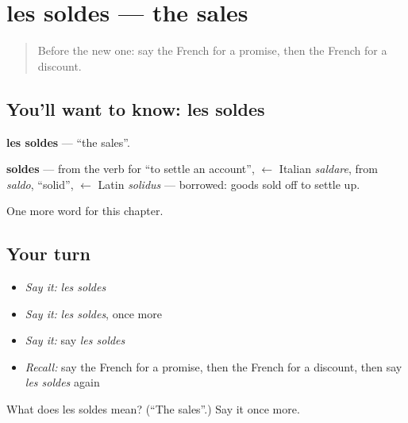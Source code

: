 \section[les soldes]{les soldes — the sales}

\label{lesson:FR-C198-soldes}



\begin{quote}
Before the new one: say the French for a promise, then the French for a discount.
\end{quote}

\subsection*{You'll want to know: les soldes}
\textbf{les soldes} — \textquotedblleft{}the sales\textquotedblright{}.

\begin{cousinweb}
\textbf{soldes} — from the verb for \textquotedblleft{}to settle an account\textquotedblright{}, $\leftarrow$ Italian \emph{saldare}, from \emph{saldo}, \textquotedblleft{}solid\textquotedblright{}, $\leftarrow$ Latin \emph{solidus} — borrowed: goods sold off to settle up.
\end{cousinweb}

\begin{grammarlens}[title={What you've built}]
One more word for this chapter.
\end{grammarlens}

\subsection*{Your turn}
\begin{itemize}
\raggedright
  \item \emph{Say it:} \emph{les soldes}
  \item \emph{Say it:} \emph{les soldes}, once more
  \item \emph{Say it:} say \emph{les soldes}
  \item \emph{Recall:} say the French for a promise, then the French for a discount, then say \emph{les soldes} again
\end{itemize}

\begin{tcolorbox}[breakable,colback=teal!4,colframe=teal!35!black,title={Before you move on}]
What does les soldes mean? (\textquotedblleft{}The sales\textquotedblright{}.) Say it once more.
\end{tcolorbox}
